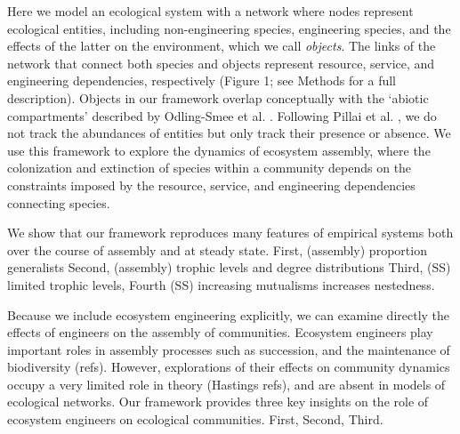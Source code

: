 \documentclass[9pt,twocolumn,twoside]{pnas-new}
\begin{document}
Here we model an ecological system with a network where nodes represent ecological entities, including non-engineering species, engineering species, and the effects of the latter on the environment, which we call \emph{objects}.
The links of the network that connect both species and objects represent resource, service, and engineering dependencies, respectively (Figure 1; see Methods for a full description).
Objects in our framework overlap conceptually with the `abiotic compartments' described by Odling-Smee et al. \cite{OdlingSmee2013}.
Following Pillai et al. \cite{Pillai2011}, we do not track the abundances of entities but only track their presence or absence.
We use this framework to explore the dynamics of ecosystem assembly, where the colonization and extinction of species within a community depends on the constraints imposed by the resource, service, and engineering dependencies connecting species.



We show that our framework reproduces many features of empirical systems both over the course of assembly and at steady state.
First, (assembly) proportion generalists
Second, (assembly) trophic levels and degree distributions
Third, (SS) limited trophic levels,
Fourth (SS) increasing mutualisms increases nestedness.

Because we include ecosystem engineering explicitly, we can examine directly the effects of engineers on the assembly of communities.
Ecosystem engineers play important roles in assembly processes such as succession, and the maintenance of biodiversity (refs).
However, explorations of their effects on community dynamics occupy a very limited role in theory (Hastings refs), and are absent in models of ecological networks.
Our framework provides three key insights on the role of ecosystem engineers on ecological communities.
First,
Second,
Third.\\
\end{document}
